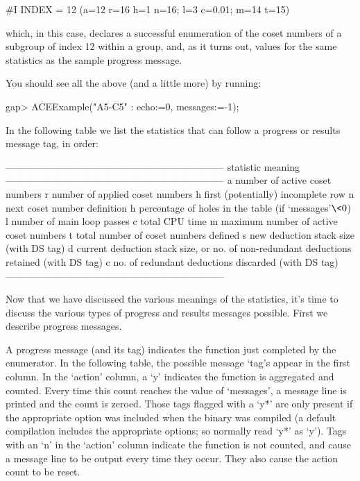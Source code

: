 \begintt
#I  INDEX = 12 (a=12 r=16 h=1 n=16; l=3 c=0.01; m=14 t=15)
\endtt

which, in this case, declares a successful enumeration  of  the  coset
numbers of a subgroup of index 12 within a group,  and,  as  it  turns
out, values for the same statistics as the sample progress message.

You should see all the above (and a little  more) by running:

\beginexample
gap> ACEExample("A5-C5" : echo:=0, messages:=-1);
\endexample

In the following table we  list  the  statistics  that  can  follow  a
progress or results message tag, in order:

\begintt
--------------------------------------------------------------------
statistic   meaning
--------------------------------------------------------------------
a           number of active coset numbers
r           number of applied coset numbers
h           first (potentially) incomplete row
n           next coset number definition
h           percentage of holes in the table (if `messages'$ \< 0$) 
l           number of main loop passes
c           total CPU time
m           maximum number of active coset numbers
t           total number of coset numbers defined
s           new deduction stack size (with DS tag)
d           current deduction stack size, or
              no. of non-redundant deductions retained (with DS tag)
c           no. of redundant deductions discarded (with DS tag)
--------------------------------------------------------------------
\endtt

Now that we have discussed the various  meanings  of  the  statistics,
it's time to  discuss  the  various  types  of  progress  and  results
messages possible. First we describe progress messages.


A progress message (and its tag) indicates the function just completed
by the enumerator. In the following table, the possible message `tag's
appear in the first column. In the `action' column,  a  `y'  indicates
the function is aggregated and counted. Every time this count  reaches
the value of `messages', a message line is printed and  the  count  is
zeroed. Those tags flagged  with  a  `y*'  are  only  present  if  the
appropriate option was included when the {\ACE} binary was compiled (a
default compilation includes the appropriate options; so normally read
`y*' as `y'). Tags with an `n' in the  `action'  column  indicate  the
function is not counted, and cause a message line to be  output  every
time they occur. They also cause the action count to be reset.

